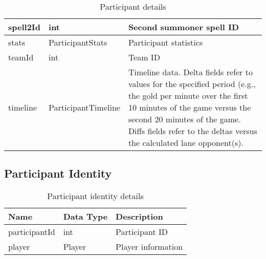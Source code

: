 \begin{table}[!htb]
\begin{tabular}{|llp{5cm}|}
spell2Id                  & int                 & Second summoner spell ID                                                                                                                                                                                                                                 \\ \hline
stats                     & ParticipantStats    & Participant statistics                                                                                                                                                                                                                                   \\ \hline
teamId                    & int                 & Team ID                                                                                                                                                                                                                                                  \\ \hline
timeline                  & ParticipantTimeline & Timeline data. Delta fields refer to values for the specified period (e.g., the gold per minute over the first 10 minutes of the game versus the second 20 minutes of the game. Diffs fields refer to the deltas versus the calculated lane opponent(s). \\ \hline
\end{tabular}
\caption{Participant details}\label{tab:participant}
\end{table}

\FloatBarrier
\subsection{Participant Identity}
\begin{table}[!htb]
\footnotesize
\centering
\begin{tabular}{|llp{5cm}|}
\hline
\textbf{Name} & \textbf{Data Type} & \textbf{Description} \\ \hline
participantId & int & Participant ID \\ \hline
player & Player & Player information \\ \hline
\end{tabular}
\caption{Participant identity details}\label{tab:part-ident}
\end{table}

\FloatBarrier
